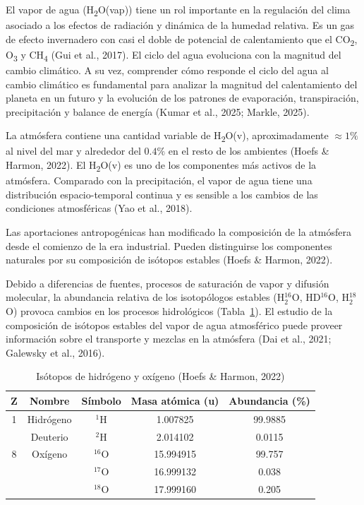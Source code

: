El vapor de agua (H\textsubscript{2}O(vap)) tiene un rol importante en la regulación del
clima asociado a los efectos de radiación y dinámica de la humedad relativa. Es
un gas de efecto invernadero con casi el doble de potencial de
calentamiento que el CO\textsubscript{2}, O\textsubscript{3} y
CH\textsubscript{4} (Gui et al., 2017). El ciclo del agua evoluciona
con la magnitud del cambio climático. A su vez, comprender cómo
responde el ciclo del agua al cambio climático es fundamental para
analizar la magnitud del calentamiento del planeta en un futuro y la
evolución de los patrones de evaporación, transpiración, precipitación
y balance de energía (Kumar et al., 2025; Markle, 2025).

La atmósfera contiene una cantidad variable de H\textsubscript{2}O(v),
aproximadamente $\approx 1\%$ al nivel del mar y alrededor del $0.4\%$
en el resto de los ambientes (Hoefs \& Harmon, 2022). El
H\textsubscript{2}O(v) es uno de los componentes más activos de la
atmósfera. Comparado con la precipitación, el vapor de agua tiene una
distribución espacio-temporal continua y es sensible a los cambios de
las condiciones atmosféricas (Yao et al., 2018).

Las aportaciones antropogénicas han modificado la composición de la
atmósfera desde el comienzo de la era industrial. Pueden distinguirse
los componentes naturales por su composición de isótopos estables
(Hoefs \& Harmon, 2022).

Debido a diferencias de fuentes, procesos de saturación de vapor y 
difusión molecular, la abundancia relativa de los isotopólogos estables
(H$_2^{16}$O, HD$^{16}$O, H$_2^{18}$O) provoca cambios en los procesos
hidrológicos (Tabla~\ref{tab:isotopos}). 
El estudio de la composición de isótopos estables del vapor de agua 
atmosférico puede proveer información sobre el transporte y mezclas 
en la atmósfera (Dai et al., 2021; Galewsky et al., 2016).

\begin{table}[h!]
\centering
\caption{Isótopos de hidrógeno y oxígeno (Hoefs \& Harmon, 2022)}
\label{tab:isotopos}
\begin{tabular}{ccccc}
\toprule
\textbf{Z} & \textbf{Nombre} & \textbf{Símbolo} & \textbf{Masa atómica (u)} & \textbf{Abundancia (\%)} \\
\midrule
1 & Hidrógeno & $^1$H & 1.007825 & 99.9885 \\
  & Deuterio  & $^2$H & 2.014102 & 0.0115 \\
8 & Oxígeno   & $^{16}$O & 15.994915 & 99.757 \\
  &           & $^{17}$O & 16.999132 & 0.038 \\
  &           & $^{18}$O & 17.999160 & 0.205 \\
\bottomrule
\end{tabular}
\end{table}

